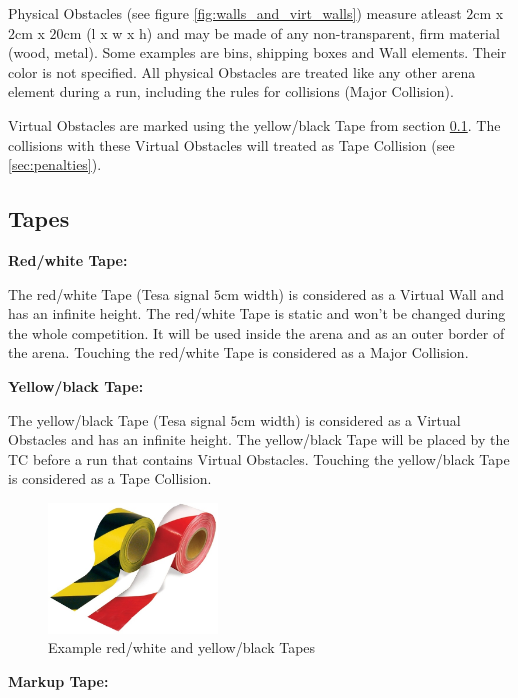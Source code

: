 Physical Obstacles (see figure \ref{fig:walls_and_virt_walls}) measure atleast $2\si{\centi\meter}$ x $2\si{\centi\meter}$ x $20\si{\centi\meter}$ (l x w x h) and may be made of any non-transparent, firm material (wood, metal). Some examples are bins, shipping boxes and Wall elements. Their color is not specified.
All physical Obstacles are treated like any other arena element during a run, including the rules for collisions (Major Collision).

Virtual Obstacles are marked using the yellow/black Tape from section \ref{subsec:Tapes}. The collisions with these Virtual Obstacles will treated as Tape Collision (see \ref{sec:penalties}).


\subsection{Tapes}
\label{subsec:Tapes}

\textbf{Red/white Tape:}

The red/white Tape (Tesa signal $5\si{\centi\meter}$ width) is considered as a Virtual Wall and has an infinite height. The red/white Tape is static and won't be changed during the whole competition. It will be used inside the arena and as an outer border of the arena.  Touching the red/white Tape is considered as a Major Collision.

\textbf{Yellow/black Tape:}

The yellow/black Tape (Tesa signal $5\si{\centi\meter}$ width) is considered as a Virtual Obstacles and has an infinite height. The yellow/black Tape will be placed by the TC before a run that contains Virtual Obstacles. Touching the yellow/black Tape is considered as a Tape Collision.

\begin{figure} [h!]
	\centering
	\includegraphics[width= 0.4\textwidth ]{./images/general_rules/example_barrier_tape}
	\caption{Example red/white and yellow/black Tapes}
	\label{fig:tapes}
\end{figure}

\textbf{Markup Tape:}

